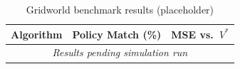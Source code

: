 \begin{table}[h!]
\centering
\caption{Gridworld benchmark results (placeholder)}
\label{tab:gridworld_results}
\begin{tabular}{lcc}
\toprule
Algorithm & Policy Match (\%) & MSE vs.\ $V^*$ \\
\midrule
\multicolumn{3}{c}{\emph{Results pending simulation run}} \\
\bottomrule
\end{tabular}
\end{table}
